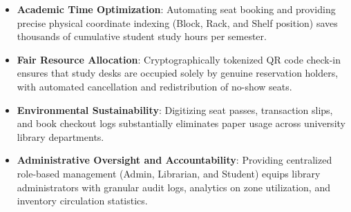 \begin{itemize}
    \item \textbf{Academic Time Optimization}: Automating seat booking and providing precise physical coordinate indexing (Block, Rack, and Shelf position) saves thousands of cumulative student study hours per semester.
    \item \textbf{Fair Resource Allocation}: Cryptographically tokenized QR code check-in ensures that study desks are occupied solely by genuine reservation holders, with automated cancellation and redistribution of no-show seats.
    \item \textbf{Environmental Sustainability}: Digitizing seat passes, transaction slips, and book checkout logs substantially eliminates paper usage across university library departments.
    \item \textbf{Administrative Oversight and Accountability}: Providing centralized role-based management (Admin, Librarian, and Student) equips library administrators with granular audit logs, analytics on zone utilization, and inventory circulation statistics.
\end{itemize}

